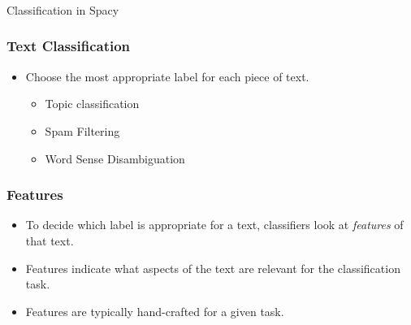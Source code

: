 \begin{frame}[fragile]\frametitle{}

\begin{center}
{\Large Classification in Spacy}
\end{center}
\end{frame}

\begin{frame}[fragile]\frametitle{Text Classification}
  \begin{itemize}
    \item Choose the most appropriate label for each piece of text.
    \begin{itemize}
      \item Topic classification
      \item Spam Filtering
      \item Word Sense Disambiguation
    \end{itemize}
  \end{itemize}
\end{frame}

\begin{frame}[fragile]\frametitle{Features}
  \begin{itemize}
    \item To decide which label is appropriate for a text, 
      classifiers look at \emph{features} of that text.
    \item Features indicate what aspects of the text are
      relevant for the classification task.
    \item Features are typically hand-crafted for a given task.
  \end{itemize}
\end{frame}

